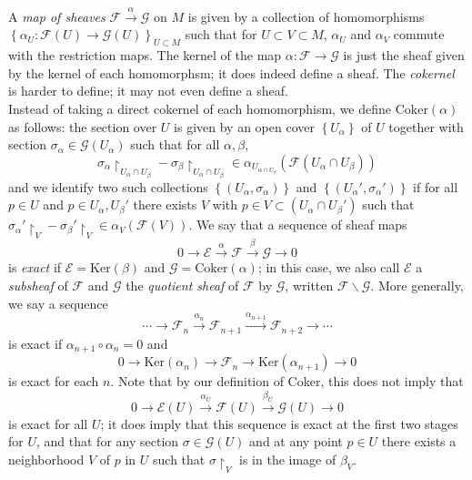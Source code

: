 A \textit{map of sheaves} $ \mathcal{F} \xrightarrow{\alpha} \mathcal{G}$ on $M$ is given by a collection of homomorphisms $ \left\{ \alpha_U: \mathcal{F}(U) \to \mathcal{G}(U) \right\}_{U \subset M}$ such that for $U \subset V \subset M$, $\alpha_U$ and $\alpha_V$ commute with the restriction maps. The kernel of the map $\alpha: \mathcal{F} \to \mathcal{G}$ is just the sheaf given by the kernel of each homomorphsm; it does indeed define a sheaf. The \textit{cokernel} is harder to define; it may not even define a sheaf.\\
Instead of taking a direct cokernel of each homomorphism, we define $ \mathrm{Coker}(\alpha)$ as follows: the section over $U$ is given by an open cover $ \left\{ U_{\alpha} \right\} $ of $U$ together with section $\sigma_{\alpha} \in \mathcal{G}(U_{\alpha})$ such that for all $\alpha, \beta$,
\[
	\sigma_{\alpha} \restriction_{U_{\alpha} \cap U_{\beta}} - \sigma_{\beta} \restriction_{U_{\alpha} \cap U_{\beta} } \in \alpha_{U_{\alpha \cap U_{\beta}}} \left( \mathcal{F}(U_{\alpha} \cap U_{\beta}) \right) 
\]
and we identify two such collections $ \left\{ (U_{\alpha}, \sigma_{\alpha} ) \right\} $ and $ \left\{ (U_{\alpha}', \sigma_{\alpha}') \right\} $ if for all $p \in U$ and $p \in U_{\alpha}, U_{\beta}'$ there exists $V$ with $p \in V \subset \left( U_{\alpha} \cap U_{\beta}' \right) $ such that $\sigma_{\alpha}' \restriction_V - \sigma_{\beta}' \restriction_V \in \alpha_V \left( \mathcal{F}(V) \right) $.
\indent We say that a sequence of sheaf maps
\[
	0 \to \mathcal{E} \xrightarrow{\alpha} \mathcal{F} \xrightarrow{\beta} \mathcal{G} \to 0
\]
is \textit{exact} if $ \mathcal{E} = \mathrm{Ker}(\beta)$ and $ \mathcal{G} = \mathrm{Coker}(\alpha)$; in this case, we also call $ \mathcal{E}$ a \textit{subsheaf} of $ \mathcal{F}$ and $ \mathcal{G}$ the \textit{quotient sheaf} of $ \mathcal{F}$ by $ \mathcal{G}$, written $ \mathcal{F} \backslash \mathcal{G}$. More generally, we say a sequence 
\[
	\cdots \to \mathcal{F}_n \xrightarrow{\alpha_n} \mathcal{F}_{n+1} \xrightarrow{\alpha_{n+1}} \mathcal{F}_{n+2} \to \cdots
\]
is exact if $ \alpha_{n+1} \circ \alpha_n = 0$ and 
\[
	0 \to \mathrm{Ker} \left( \alpha_n \right) \to \mathcal{F}_n \to \mathrm{Ker} \left( \alpha_{n+1} \right) \to 0
\]
is exact for each $n$. Note that by our definition of Coker, this does not imply that 
\[
	0 \to \mathcal{E}(U) \xrightarrow{\alpha_U} \mathcal{F}(U) \xrightarrow{\beta_U} \mathcal{G}(U) \to 0
\]
is exact for all $U$; it does imply that this sequence is exact at the first two stages for $U$, and that for any section $ \sigma \in \mathcal{G}(U)$ and at any point $p \in U$ there exists a neighborhood $V$ of $p$ in $U$ such that $\sigma \restriction_V$ is in the image of $\beta_V$. \\

